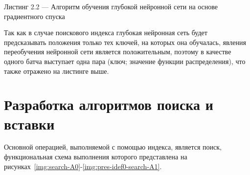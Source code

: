 \noindent\parbox[t]{\linewidth}{
Листинг 2.2 --- Алгоритм обучения глубокой нейронной сети на основе
\mbox{градиентного} спуска
}
\vspace{-1cm}
\begin{algorithm}[H]
    \label{alg:sdg}
    \small


\end{algorithm}
\vspace{1.5cm}

Так как в случае поискового индекса глубокая нейронная сеть будет предсказывать
положения только тех ключей, на которых она обучалась, явления переобучения
нейронной сети является положительным, поэтому в качестве одного батча выступает
одна пара (ключ; значение функции распределения), что также отражено на листинге
выше.

\section{Разработка алгоритмов поиска и вставки}
Основной операцией, выполняемой с помощью индекса, является поиск,
функциональная схема выполнения которого представлена на
рисунках~\ref{img:search-A0}-\ref{img:pres-idef0-search-A1}.

